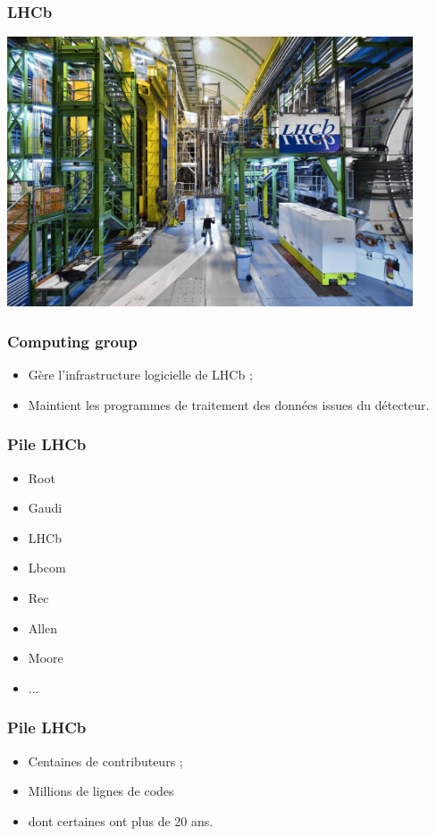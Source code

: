 \documentclass{beamer}
\begin{document}
\begin{frame}
    \frametitle{LHCb}

    \centering
    \includegraphics[width=0.90\textwidth]{LHCb.jpg}
\end{frame}

\begin{frame}
    \frametitle{Computing group}

    \begin{itemize}
        \item Gère l'infrastructure logicielle de LHCb ;
        \item Maintient les programmes de traitement des données issues du détecteur.
    \end{itemize}
\end{frame}

\begin{frame}
    \frametitle{Pile LHCb}

    \begin{itemize}
        \item Root
        \item Gaudi
        \item LHCb
        \item Lbcom
        \item Rec
        \item Allen
        \item Moore
        \item ...
    \end{itemize}
\end{frame}

\begin{frame}
    \frametitle{Pile LHCb}

    \begin{itemize}
        \item Centaines de contributeurs ;
        \item Millions de lignes de codes
        \item dont certaines ont plus de 20 ans.
    \end{itemize}
\end{frame}
\end{document}
